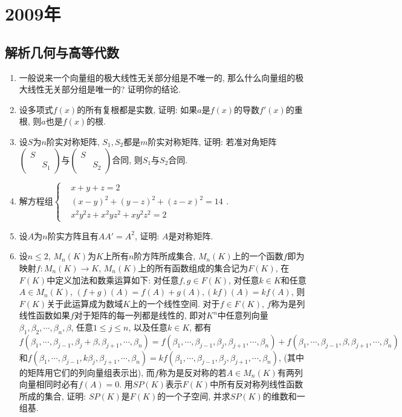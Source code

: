 \documentclass[12pt,a4paper,openany]{book}
\begin{document}
\section{2009年}
\subsection{解析几何与高等代数}
\begin{enumerate}
\item 一般说来一个向量组的极大线性无关部分组是不唯一的, 那么什么向量组的极大线性无关部分组是唯一的? 证明你的结论.

\item 设多项式$f(x)$的所有复根都是实数, 证明: 如果$a$是$f(x)$的导数$f'(x)$的重根, 则$a$也是$f(x)$的根.

\item 设$S$为$n$阶实对称矩阵, $S_1, S_2$都是$m$阶实对称矩阵, 证明: 若准对角矩阵$\begin{pmatrix} S & \\ & S_1 \end{pmatrix}$与$\begin{pmatrix} S & \\ & S_2 \end{pmatrix}$合同, 则$S_1$与$S_2$合同.

\item 解方程组$\left\{\begin{aligned}&x + y + z = 2 \\ & (x - y)^2 + (y - z)^2 + (z - x)^2 = 14 \\ &x^2y^2z + x^2yz^2 + xy^2z^2 = 2 \end{aligned} \right.$.

\item 设$A$为$n$阶实方阵且有$AA' = A^2$, 证明: $A$是对称矩阵.

\item 设$n \le 2$, $M_n(K)$为$K$上所有$n$阶方阵所成集合, $M_n(K)$上的一个函数$f$即为映射$f: M_n(K) \rightarrow K$, $M_n(K)$上的所有函数组成的集合记为$F(K)$, 在$F(K)$中定义加法和数乘运算如下: 对任意$f, g \in F(K)$, 对任意$k \in K$和任意$A \in M_n(K)$, $(f + g)(A) = f(A) + g(A), (kf)(A) = kf(A)$, 则$F(K)$关于此运算成为数域$K$上的一个线性空间. 对于$f \in F(K)$, $f$称为是列线性函数如果$f$对于矩阵的每一列都是线性的, 即对$K^n$中任意列向量$\beta_1, \beta_2, \cdots, \beta_n, \beta$, 任意$1 \le j \le n$, 以及任意$k \in K$, 都有$f(\beta_1, \cdots, \beta_{j-1}, \beta_j+\beta, \beta_{j+1}, \cdots, \beta_n) = f(\beta_1, \cdots, \beta_{j-1}, \beta_j, \beta_{j+1}, \cdots, \beta_n) + f(\beta_1, \cdots, \beta_{j-1}, \beta, \beta_{j+1}, \cdots, \beta_n)$和$f(\beta_1, \cdots, \beta_{j-1}, k\beta_j, \beta_{j+1}, \cdots, \beta_n) = kf(\beta_1, \cdots, \beta_{j-1}, \beta_j, \beta_{j+1}, \cdots, \beta_n)$, (其中的矩阵用它们的列向量组表示出), 而$f$称为是反对称的若$A \in M_n(K)$有两列向量相同时必有$f(A) = 0$. 用$SP(K)$表示$F(K)$中所有反对称列线性函数所成的集合, 证明: $SP(K)$是$F(K)$的一个子空间, 并求$SP(K)$的维数和一组基.


\end{enumerate}
\end{document}
